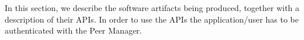 In this section, we describe the software artifacts being produced, together with a description of their APIs. In order to use the APIs the application/user has to be authenticated with the Peer Manager.


































